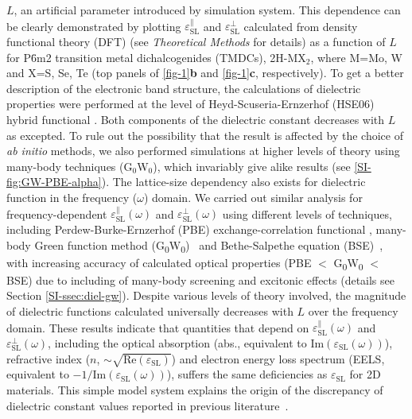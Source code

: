 $L$, an artificial parameter introduced by simulation system. This
dependence can be clearly demonstrated by plotting
$\varepsilon^{\parallel}_{\mathrm{SL}}$ and
$\varepsilon^{\perp}_{\mathrm{SL}}$ calculated from density functional
theory (DFT) (see {\itshape Theoretical Methods} for details) as a function
of $L$ for P\={6}m2 transition metal dichalcogenides (TMDCs),
2H-MX$_{2}$, where M=Mo, W and X=S, Se, Te (top panels of 
\autoref{fig-1}{\textbf b} and \autoref{fig-1}{\textbf c}, respectively). To
get a better description of the electronic band structure, the
calculations of dielectric properties were performed at the level of
Heyd-Scuseria-Ernzerhof (HSE06) hybrid functional
\cite{Heyd_2003_HSe,HSE_2006_erratum}.  Both components of the dielectric
constant decreases with $L$ as excepted. To rule out the possibility
that the result is affected by the choice of \textit{ab initio}
methods, we also performed simulations at higher levels of theory
using many-body techniques (G$_{0}$W$_{0}$), which invariably give
alike results (see   \autoref{SI-fig:GW-PBE-alpha}).
The lattice-size dependency also exists for dielectric function in the
frequency ($\omega$) domain. We carried out similar analysis for
frequency-dependent $\varepsilon^{\parallel}_{\mathrm{SL}}(\omega)$
and $\varepsilon^{\perp}_{\mathrm{SL}}(\omega)$ using different levels
of techniques, including Perdew-Burke-Ernzerhof (PBE)
exchange-correlation functional
\cite{Perdew_1996,Ernzerhof_1999,Paier_2005}, many-body Green function
method (G\textsubscript{0}W\textsubscript{0})~\cite{Hedin_1965_GW} and
Bethe-Salpethe equation (BSE)~\cite{Onida_2002_exciton_rev}, with increasing
accuracy of calculated optical properties (PBE $<$
G\textsubscript{0}W\textsubscript{0} $<$ BSE) due to including of
many-body screening and excitonic effects (details see 
Section \autoref{SI-ssec:diel-gw}). Despite various levels of theory involved,
the magnitude of dielectric functions calculated universally decreases
with $L$ over the frequency domain.  These results indicate that
quantities that depend on
$\varepsilon^{\parallel}_{\mathrm{SL}}(\omega)$ and
$\varepsilon^{\perp}_{\mathrm{SL}}(\omega)$, including the optical
absorption (abs., equivalent to $\mathrm{Im}(\varepsilon_{\mathrm{SL}}(\omega))$), refractive index ($n$,  $\sim{}\sqrt{\mathrm{Re}(\varepsilon_{\mathrm{SL}})}$) and electron energy loss spectrum (EELS, equivalent to $-1 / \mathrm{Im}(\varepsilon_{\mathrm{SL}}(\omega))$), suffers the same
deficiencies as $\varepsilon_{\mathrm{SL}}$ for 2D materials. This
simple model system explains the origin of the discrepancy of
dielectric constant values reported in previous
literature~\cite{Li_2016}.
%
%
%
%
%

